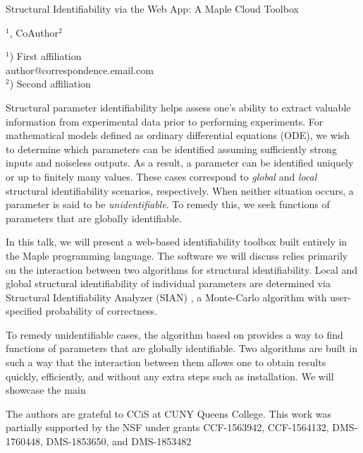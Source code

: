 \documentclass[a4paper]{article}
\begin{document}

\Large
\begin{center}
    Structural Identifiability via the Web App: A Maple Cloud Toolbox \\

    \hspace{10pt}

    \large
    $^1$, CoAuthor$^2$ \\

    \hspace{10pt}

    \small
    $^1$) First affiliation\\
    author@correspondence.email.com\\
    $^2$) Second affiliation

\end{center}

\hspace{10pt}

\normalsize


Structural parameter identifiability helps assess one's ability to extract valuable information from experimental data prior to performing experiments. For mathematical models defined as ordinary differential equations (ODE), we wish to determine which parameters can be identified assuming sufficiently strong inputs and noiseless outputs. As a result, a parameter can be identified uniquely or up to finitely many values. These cases correspond to \emph{global} and \emph{local} structural identifiability scenarios, respectively. When neither situation occurs, a parameter is said to be \emph{unidentifiable}. To remedy this, we seek functions of parameters that are globally identifiable.

In this talk, we will present a web-based identifiability toolbox built entirely in the {\sc Maple} programming language. The software we will discuss relies primarily on the interaction between two algorithms for structural identifiability. Local and global structural identifiability of individual parameters are determined via Structural Identifiability Analyzer (SIAN) \cite{hong_global_2020,hong_sian_2019}, a Monte-Carlo algorithm with user-specified probability of correctness.

To remedy unidentifiable cases, the algorithm based on \cite{ovchinnikov2020computing,ovchinnikov2020multi} provides a way to find functions of parameters that are globally identifiable. Two algorithms are built in such a way that the interaction between them allows one to obtain results quickly, efficiently, and without any extra steps such as installation. We will showcase the main

The authors are grateful to CCiS at CUNY Queens College. This work was partially supported by the NSF under grants CCF-1563942, CCF-1564132, DMS-1760448, DMS-1853650, and DMS-1853482
\printbibliography{}
\end{document}
